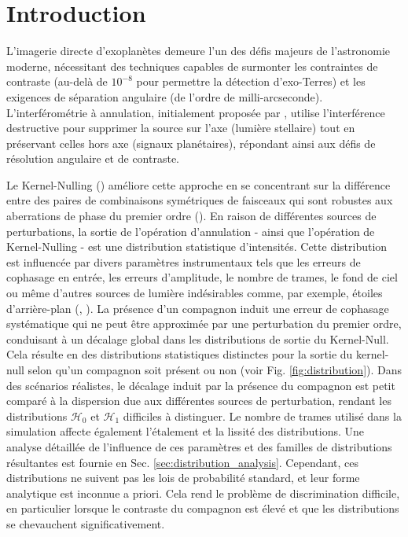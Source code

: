 \documentclass{article}
\begin{document}
\section{Introduction}

L'imagerie directe d'exoplanètes demeure l'un des défis majeurs de l'astronomie moderne, nécessitant des techniques capables de surmonter les contraintes de contraste (au-delà de $10^{-8}$ pour permettre la détection d'exo-Terres) et les exigences de séparation angulaire (de l'ordre de milli-arcseconde). L'interférométrie à annulation, initialement proposée par \cite{Bracewell1979}, utilise l'interférence destructive pour supprimer la source sur l'axe (lumière stellaire) tout en préservant celles hors axe (signaux planétaires), répondant ainsi aux défis de résolution angulaire et de contraste.

Le Kernel-Nulling (\cite{Martinache2018}) améliore cette approche en se concentrant sur la différence entre des paires de combinaisons  symétriques de faisceaux qui sont robustes aux aberrations de phase du premier ordre (\cite{Martinache2018}). En raison de différentes sources de perturbations, la sortie de l'opération d'annulation - ainsi que l'opération de Kernel-Nulling - est une distribution statistique d'intensités. Cette distribution est influencée par divers paramètres instrumentaux tels que les erreurs de cophasage en entrée, les erreurs d'amplitude, le nombre de trames, le fond de ciel ou même d'autres sources de lumière indésirables comme, par exemple, étoiles d'arrière-plan (\cite{Hanot2011}, \cite{Cvetojevic2022}). La présence d'un compagnon induit une erreur de cophasage systématique qui ne peut être approximée par une perturbation du premier ordre, conduisant à un décalage global dans les distributions de sortie du Kernel-Null. Cela résulte en des distributions statistiques distinctes pour la sortie du kernel-null selon qu'un compagnon soit présent ou non (voir Fig. \ref{fig:distribution}). Dans des scénarios réalistes, le décalage induit par la présence du compagnon est petit comparé à la dispersion due aux différentes sources de perturbation, rendant les distributions $\mathcal{H}_0$ et $\mathcal{H}_1$ difficiles à distinguer. Le nombre de trames utilisé dans la simulation affecte également l'étalement et la lissité des distributions. Une analyse détaillée de l'influence de ces paramètres et des familles de distributions résultantes est fournie en Sec. \ref{sec:distribution_analysis}. Cependant, ces distributions ne suivent pas les lois de probabilité standard, et leur forme analytique est inconnue a priori. Cela rend le problème de discrimination difficile, en particulier lorsque le contraste du compagnon est élevé et que les distributions se chevauchent significativement.
\end{document}
